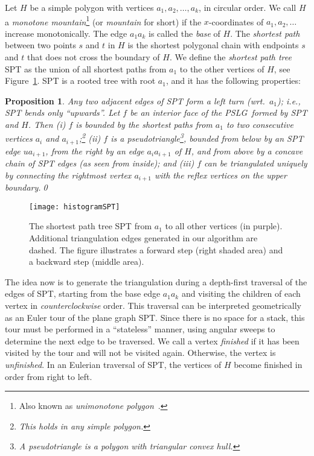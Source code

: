 \documentclass[11pt,a4paper]{article}
\newtheorem{proposition}[theorem]{Proposition}
\newcommand{\histogram}{mountain}
\newcommand{\pslg}{PSLG}
\begin{document}
Let $H$ be a simple polygon with vertices
$a_1, a_2, \dots, a_k$, in circular order.
We call $H$ a  \emph{monotone mountain}\footnote{Also known as
\emph{unimonotone polygon}~\cite{FournierMo84}.}
(or \emph{\histogram} for short) if the $x$-coordinates of
$a_1, a_2, \dots$ increase monotonically.
The edge $a_1a_k$ is called the \emph{base} of $H$.
The \emph{shortest path} between two points $s$ and $t$ in $H$ is
the shortest polygonal chain with endpoints $s$ and $t$ that does not
cross the boundary of $H$.
We define the \emph{shortest path tree} SPT as the union of all
shortest paths from $a_1$ to the other vertices of $H$, see
Figure~\ref{fig:SPT}. SPT is a rooted tree with root $a_1$,
and it has the following properties:
\begin{proposition}
\label{prop:spt}
Any two adjacent edges of SPT form a left turn \textup(wrt.\ $a_1$\textup);
i.e., SPT bends only ``upwards''.
Let $f$ be an interior face of the \pslg\ formed by SPT
and $H$. Then (i) $f$ is bounded by the shortest paths
from $a_1$ to two consecutive vertices $a_i$
  and $a_{i+1}$;\footnote{This holds in any simple polygon.}
  (ii) $f$ is a
pseudotriangle\footnote{A pseudotriangle is a polygon with triangular convex hull.}, bounded from below by
 an SPT edge $ua_{i+1}$, from the right by an edge $a_ia_{i+1}$ of $H$,
 and from above by a concave chain
 of SPT edges \textup(as seen from inside\textup);
 and (iii)
 $f$ can be triangulated uniquely by connecting
  the rightmost vertex $a_{i+1}$ with the
  reflex vertices on the upper
  boundary.\qed
\end{proposition}

\begin{figure}
\begin{center}
\texttt{[image: histogramSPT]}
\end{center}
\caption{The shortest path tree SPT from $a_1$ to all other vertices
(in purple). Additional triangulation edges generated in our algorithm
are dashed. The figure illustrates a forward step (right shaded area)
and a backward step (middle area).}
\label{fig:SPT}
\end{figure}


The idea now is to generate the triangulation during a depth-first traversal of
the edges of SPT, starting
from the base edge $a_1a_k$ and visiting the children
of each vertex in \emph{counterclockwise} order.
This traversal can be interpreted geometrically as an Euler tour
of the plane graph SPT.
Since there is no space for a stack, this tour must be performed
in a ``stateless'' manner, using angular sweeps to determine the
next edge to be traversed.
We call a vertex \emph{finished} if it has been visited by
the tour and will not be visited again. Otherwise, the vertex is
\emph{unfinished}. In an Eulerian traversal of SPT, the vertices
of $H$ become finished in order from right to left.
\end{document}
